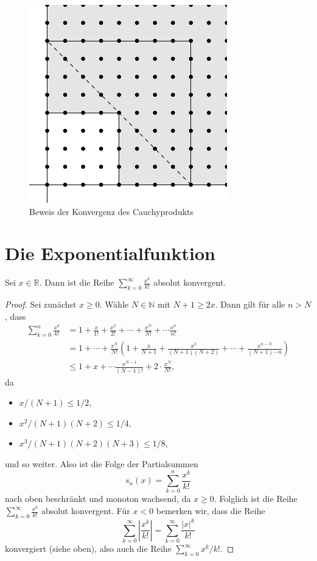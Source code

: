 \documentclass[../main.tex]{subfiles}
\begin{document}
\begin{figure}[htb]
  \centering
  \includegraphics{images/cauchy-thm}
  \caption{Beweis der Konvergenz des Cauchyprodukts}%
  \label{fig:cauchy-proof}
\end{figure}

\newpage
\section{Die Exponentialfunktion}
\begin{lemma*}
  Sei $x \in \mathbb{R}$. Dann ist die Reihe
  $\sum_{k=0}^{\infty} \frac{x^k}{k!}$ absolut konvergent.
\end{lemma*}

\begin{proof}
  Sei zunächst $x \geq 0$. Wähle $N \in \mathbb{N}$ mit
  $N+ 1 \geq 2x$.
  Dann gilt für alle $n > N$, dass
  \begin{align*}
    \sum_{k=0}^{n} \frac{x^k}{k!}    & 
    = 1 + \frac{x}{1!} + \frac{x^2}{2!} + \cdots
    + \frac{x^N}{N!} + \cdots \frac{x^n}{n!} \\ &
    = 1 + \cdots + \frac{x^N}{N!}
    \left( 1 + \frac{x}{N+1} + \frac{x^2}{(N+1)(N+2)}
  + \cdots + \frac{x^{n-N}}{(N+1) \cdots n}\right)\\ &
    \leq 1 + x + \cdots \frac{x^{N-1}}{(N-1)!} + 2 \cdot
    \frac{x^N}{N!},
  \end{align*}
  da
  \begin{itemize}
    \item $x/(N+1) \leq 1/2$,
    \item $x^2/(N+1)(N+2) \leq 1/4$,
    \item $x^3/(N+1)(N+2)(N+3) \leq 1/8$,
  \end{itemize}
  und so weiter.
  Also ist die Folge der Partialsummen
  \[
    s_n(x) = \sum_{k=0}^{n} \frac{x^k}{k!}
  \]
  nach oben beschränkt und monoton wachsend, da $x \geq 0$.
  Folglich ist die Reihe
  $\sum_{k=0}^{\infty} \frac{x^k}{k!}$ absolut konvergent.
  Für $x < 0$ bemerken wir,
  dass die Reihe
  \[
    \sum_{k=0}^{\infty} \left| \frac{x^k}{k!} \right|
    = \sum_{k=0}^{\infty} \frac{|x|^k}{k!}
  \]
  konvergiert (siehe oben), also auch die Reihe
  $\sum_{k=0}^{\infty} x^k/k!$.%
\end{proof}
\end{document}
